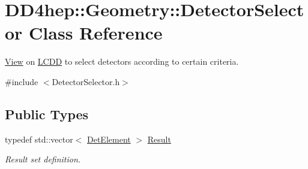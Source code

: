 \hypertarget{class_d_d4hep_1_1_geometry_1_1_detector_selector}{
\section{DD4hep::Geometry::DetectorSelector Class Reference}
\label{class_d_d4hep_1_1_geometry_1_1_detector_selector}
}


\hyperlink{class_d_d4hep_1_1_view}{View} on \hyperlink{class_d_d4hep_1_1_geometry_1_1_l_c_d_d}{LCDD} to select detectors according to certain criteria.  


{\ttfamily \#include $<$DetectorSelector.h$>$}\subsection*{Public Types}
\begin{DoxyCompactItemize}
\item 
typedef std::vector$<$ \hyperlink{class_d_d4hep_1_1_geometry_1_1_det_element}{DetElement} $>$ \hyperlink{class_d_d4hep_1_1_geometry_1_1_detector_selector_a6ce0dfe8c83f5d36138244218f260ed1}{Result}
\begin{DoxyCompactList}\small\item\em Result set definition. \item\end{DoxyCompactList}\end{DoxyCompactItemize}
